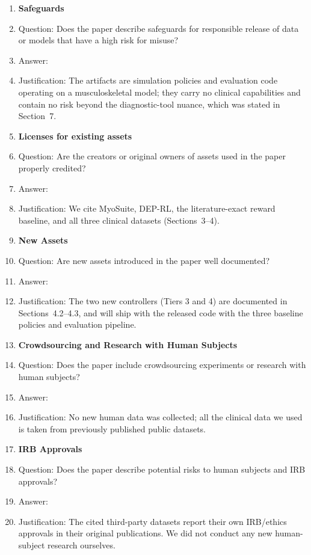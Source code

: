 \documentclass{article}
\begin{document}
\begin{enumerate}
\item {\bf Safeguards}
    \item[] Question: Does the paper describe safeguards for responsible release of data or models that have a high risk for misuse?
    \item[] Answer: \answerNA{}
    \item[] Justification: The artifacts are simulation policies and evaluation code operating on a musculoskeletal model; they carry no clinical capabilities and contain no risk beyond the diagnostic-tool nuance, which was stated in Section~7.

\item {\bf Licenses for existing assets}
    \item[] Question: Are the creators or original owners of assets used in the paper properly credited?
    \item[] Answer: \answerYes{}
    \item[] Justification: We cite MyoSuite, DEP-RL, the literature-exact reward baseline, and all three clinical datasets (Sections~3--4).

\item {\bf New Assets}
    \item[] Question: Are new assets introduced in the paper well documented?
    \item[] Answer: \answerYes{}
    \item[] Justification: The two new controllers (Tiers 3 and 4) are documented in Sections~4.2--4.3, and will ship with the released code with the three baseline policies and evaluation pipeline.

\item {\bf Crowdsourcing and Research with Human Subjects}
    \item[] Question: Does the paper include crowdsourcing experiments or research with human subjects?
    \item[] Answer: \answerNA{}
    \item[] Justification: No new human data was collected; all the clinical data we used is taken from previously published public datasets.

\item {\bf IRB Approvals}
    \item[] Question: Does the paper describe potential risks to human subjects and IRB approvals?
    \item[] Answer: \answerNA{}
    \item[] Justification: The cited third-party datasets report their own IRB/ethics approvals in their original publications. We did not conduct any new human-subject research ourselves.

\end{enumerate}
\end{document}

